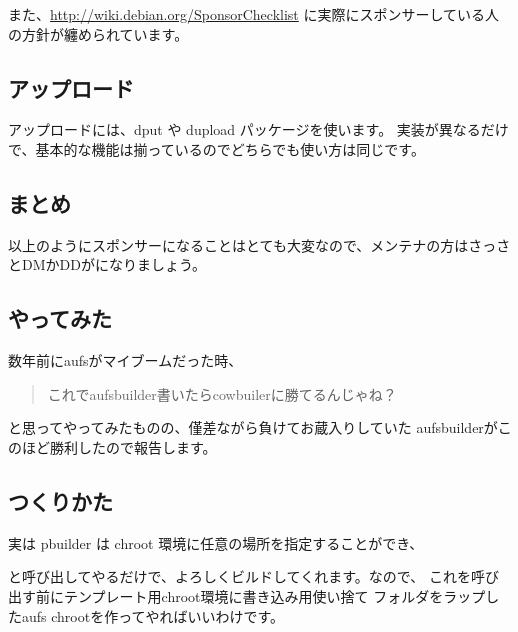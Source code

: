 \documentclass[mingoth,a4paper]{jsarticle}
\begin{document}
また、\url{http://wiki.debian.org/SponsorChecklist}
に実際にスポンサーしている人の方針が纏められています。

\subsection{アップロード}
アップロードには、dput や dupload パッケージを使います。
実装が異なるだけで、基本的な機能は揃っているのでどちらでも使い方は同じです。

\subsection{まとめ}
以上のようにスポンサーになることはとても大変なので、メンテナの方はさっさとDMかDDがになりましょう。


\subsection{やってみた}
数年前にaufsがマイブームだった時、
\begin{quote}
\Large{これでaufsbuilder書いたらcowbuilerに勝てるんじゃね？}
\end{quote}
と思ってやってみたものの、僅差ながら負けてお蔵入りしていた
aufsbuilderがこのほど勝利したので報告します。

\subsection{つくりかた}
実は pbuilder は chroot 環境に任意の場所を指定することができ、


と呼び出してやるだけで、よろしくビルドしてくれます。なので、
これを呼び出す前にテンプレート用chroot環境に書き込み用使い捨て
フォルダをラップしたaufs chrootを作ってやればいいわけです。
\end{document}
